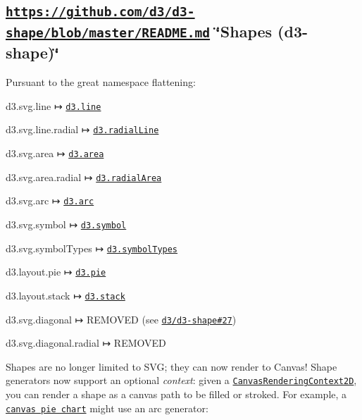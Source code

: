 \subsection*{\href{https://github.com/d3/d3-shape/blob/master/README.md}{\tt https\+://github.\+com/d3/d3-\/shape/blob/master/\+R\+E\+A\+D\+M\+E.\+md} \char`\"{}\+Shapes (d3-\/shape)\char`\"{}}

Pursuant to the great namespace flattening\+:


\begin{DoxyItemize}
\item d3.\+svg.\+line ↦ \href{https://github.com/d3/d3-shape/blob/master/README.md#lines}{\tt d3.\+line}
\item d3.\+svg.\+line.\+radial ↦ \href{https://github.com/d3/d3-shape/blob/master/README.md#radialLine}{\tt d3.\+radial\+Line}
\item d3.\+svg.\+area ↦ \href{https://github.com/d3/d3-shape/blob/master/README.md#areas}{\tt d3.\+area}
\item d3.\+svg.\+area.\+radial ↦ \href{https://github.com/d3/d3-shape/blob/master/README.md#radialArea}{\tt d3.\+radial\+Area}
\item d3.\+svg.\+arc ↦ \href{https://github.com/d3/d3-shape/blob/master/README.md#arcs}{\tt d3.\+arc}
\item d3.\+svg.\+symbol ↦ \href{https://github.com/d3/d3-shape/blob/master/README.md#symbols}{\tt d3.\+symbol}
\item d3.\+svg.\+symbol\+Types ↦ \href{https://github.com/d3/d3-shape/blob/master/README.md#symbolTypes}{\tt d3.\+symbol\+Types}
\item d3.\+layout.\+pie ↦ \href{https://github.com/d3/d3-shape/blob/master/README.md#pies}{\tt d3.\+pie}
\item d3.\+layout.\+stack ↦ \href{https://github.com/d3/d3-shape/blob/master/README.md#stacks}{\tt d3.\+stack}
\item d3.\+svg.\+diagonal ↦ R\+E\+M\+O\+V\+ED (see \href{https://github.com/d3/d3-shape/issues/27}{\tt d3/d3-\/shape\#27})
\item d3.\+svg.\+diagonal.\+radial ↦ R\+E\+M\+O\+V\+ED
\end{DoxyItemize}

Shapes are no longer limited to S\+VG; they can now render to Canvas! Shape generators now support an optional {\itshape context}\+: given a \href{https://developer.mozilla.org/en-US/docs/Web/API/CanvasRenderingContext2D}{\tt Canvas\+Rendering\+Context2D}, you can render a shape as a canvas path to be filled or stroked. For example, a \href{https://bl.ocks.org/mbostock/8878e7fd82034f1d63cf}{\tt canvas pie chart} might use an arc generator\+:


